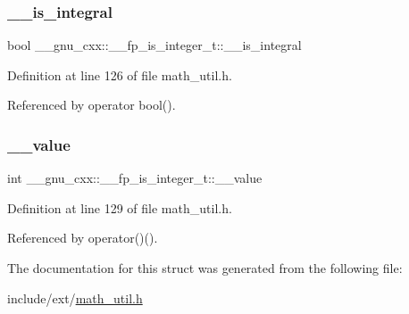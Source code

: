 \subsubsection{\texorpdfstring{\+\_\+\+\_\+is\+\_\+integral}{\_\_is\_integral}}
{\footnotesize\ttfamily bool \+\_\+\+\_\+gnu\+\_\+cxx\+::\+\_\+\+\_\+fp\+\_\+is\+\_\+integer\+\_\+t\+::\+\_\+\+\_\+is\+\_\+integral}



Definition at line 126 of file math\+\_\+util.\+h.



Referenced by operator bool().

\mbox{\label{struct____gnu__cxx_1_1____fp__is__integer__t_ad30e10c2e2dc2b23d42b4bbbf5592425}} 
\subsubsection{\texorpdfstring{\+\_\+\+\_\+value}{\_\_value}}
{\footnotesize\ttfamily int \+\_\+\+\_\+gnu\+\_\+cxx\+::\+\_\+\+\_\+fp\+\_\+is\+\_\+integer\+\_\+t\+::\+\_\+\+\_\+value}



Definition at line 129 of file math\+\_\+util.\+h.



Referenced by operator()().



The documentation for this struct was generated from the following file\+:\begin{DoxyCompactItemize}
\item 
include/ext/\hyperlink{math__util_8h}{math\+\_\+util.\+h}\end{DoxyCompactItemize}
